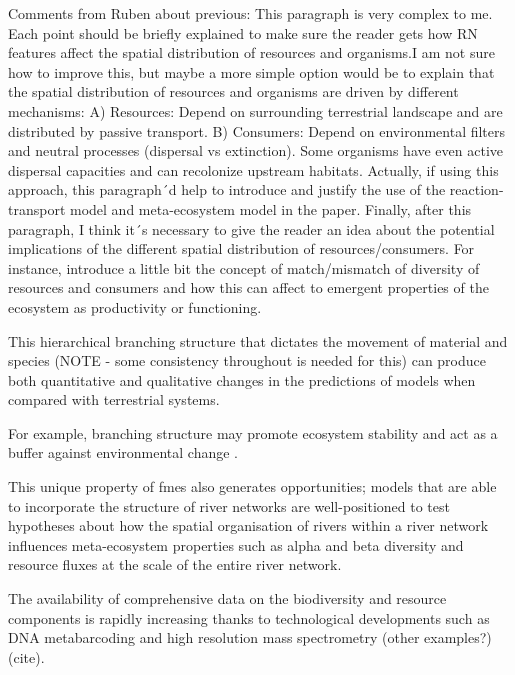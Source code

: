 \begin{itemize}
{        Comments from Ruben about previous: This paragraph is very complex to me. Each point should be briefly explained to make sure the reader gets how RN features affect the spatial distribution of resources and organisms.I am not sure how to improve this, but maybe a more simple option would be to explain that the spatial distribution of resources and organisms are driven by different mechanisms: A) Resources: Depend on surrounding terrestrial landscape and are distributed by passive transport. B) Consumers: Depend on environmental filters and neutral processes (dispersal vs extinction). Some organisms have even active dispersal capacities and can recolonize upstream habitats. Actually, if using this approach, this paragraph´d help to introduce and justify the use of the reaction-transport model and meta-ecosystem model in the paper. Finally, after this paragraph, I think it´s necessary to give the reader an idea about the potential implications of the different spatial distribution of resources/consumers. For instance, introduce a little bit the concept of match/mismatch of diversity of resources and consumers and how this can affect to emergent properties of the ecosystem as productivity or functioning.




		
		
		This hierarchical branching structure that dictates the movement of material and species (NOTE - some consistency throughout is needed for this) can produce both quantitative and qualitative changes in the predictions of models when compared with terrestrial systems. 
		
		For example, branching structure may promote ecosystem stability and act as a buffer against environmental change \autocite{Terui2018}.
		
		This unique property of \acp{fme} also generates opportunities; models that are able to incorporate the structure of river networks are well-positioned to test hypotheses about how the spatial organisation of rivers within a river network influences meta-ecosystem properties such as alpha and beta diversity and resource fluxes at the scale of the entire river network.}

		{The availability of comprehensive data on the biodiversity and resource components is rapidly increasing thanks to technological developments such as DNA metabarcoding and high resolution mass spectrometry (other examples?) (cite).
		
}
\end{itemize}
